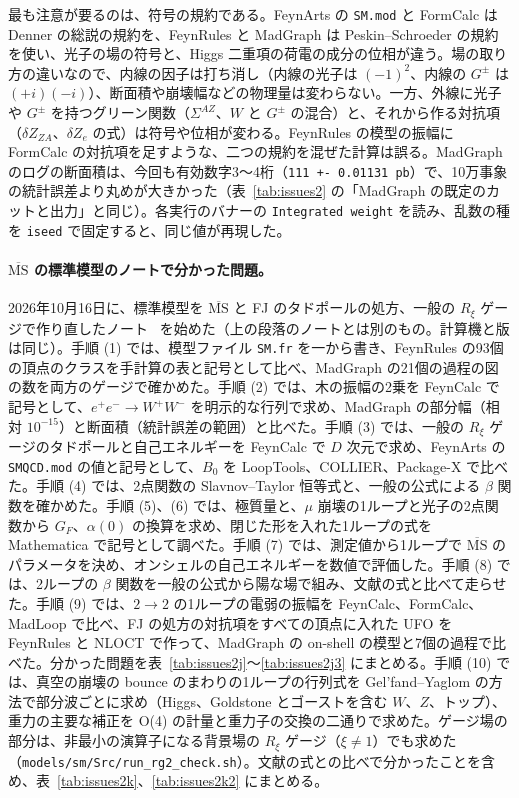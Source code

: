 \documentclass[a4paper,10pt]{ltjsarticle}
\begin{document}
最も注意が要るのは、符号の規約である。FeynArts の \texttt{SM.mod} と FormCalc は Denner の総説の規約を、FeynRules と MadGraph は Peskin--Schroeder の規約を使い、光子の場の符号と、Higgs 二重項の荷電の成分の位相が違う。場の取り方の違いなので、内線の因子は打ち消し（内線の光子は $(-1)^2$、内線の $G^\pm$ は $(+i)(-i)$）、断面積や崩壊幅などの物理量は変わらない。一方、外線に光子や $G^\pm$ を持つグリーン関数（$\Sigma^{AZ}$、$W$ と $G^\pm$ の混合）と、それから作る対抗項（$\delta Z_{ZA}$、$\delta Z_e$ の式）は符号や位相が変わる。FeynRules の模型の振幅に FormCalc の対抗項を足すような、二つの規約を混ぜた計算は誤る。MadGraph のログの断面積は、今回も有効数字3〜4桁（\texttt{111 +- 0.01131 pb}）で、10万事象の統計誤差より丸めが大きかった（表~\ref{tab:issues2} の「MadGraph の既定のカットと出力」と同じ）。各実行のバナーの \texttt{Integrated weight} を読み、乱数の種を \texttt{iseed} で固定すると、同じ値が再現した。

\paragraph{$\overline{\mathrm{MS}}$ の標準模型のノートで分かった問題。}2026年10月16日に、標準模型を $\overline{\mathrm{MS}}$ と FJ のタドポールの処方、一般の $R_\xi$ ゲージで作り直したノート~\cite{smmsbarnote} を始めた（上の段落のノートとは別のもの。計算機と版は同じ）。手順 (1) では、模型ファイル \texttt{SM.fr} を一から書き、FeynRules の93個の頂点のクラスを手計算の表と記号として比べ、MadGraph の21個の過程の図の数を両方のゲージで確かめた。手順 (2) では、木の振幅の2乗を FeynCalc で記号として、$e^+e^-\to W^+W^-$ を明示的な行列で求め、MadGraph の部分幅（相対 $10^{-15}$）と断面積（統計誤差の範囲）と比べた。手順 (3) では、一般の $R_\xi$ ゲージのタドポールと自己エネルギーを FeynCalc で $D$ 次元で求め、FeynArts の \texttt{SMQCD.mod} の値と記号として、$B_0$ を LoopTools、COLLIER、Package-X で比べた。手順 (4) では、2点関数の Slavnov--Taylor 恒等式と、一般の公式による $\beta$ 関数を確かめた。手順 (5)、(6) では、極質量と、$\mu$ 崩壊の1ループと光子の2点関数から $G_F$、$\alpha(0)$ の換算を求め、閉じた形を入れた1ループの式を Mathematica で記号として調べた。手順 (7) では、測定値から1ループで $\overline{\mathrm{MS}}$ のパラメータを決め、オンシェルの自己エネルギーを数値で評価した。手順 (8) では、2ループの $\beta$ 関数を一般の公式から陽な場で組み、文献の式と比べて走らせた。手順 (9) では、$2\to2$ の1ループの電弱の振幅を FeynCalc、FormCalc、MadLoop で比べ、FJ の処方の対抗項をすべての頂点に入れた UFO を FeynRules と NLOCT で作って、MadGraph の on-shell の模型と7個の過程で比べた。分かった問題を表~\ref{tab:issues2j}〜\ref{tab:issues2j3} にまとめる。手順 (10) では、真空の崩壊の bounce のまわりの1ループの行列式を Gel'fand--Yaglom の方法で部分波ごとに求め（Higgs、Goldstone とゴーストを含む $W$、$Z$、トップ）、重力の主要な補正を O(4) の計量と重力子の交換の二通りで求めた。ゲージ場の部分は、非最小の演算子になる背景場の $R_\xi$ ゲージ（$\xi\ne1$）でも求めた（\nolinkurl{models/sm/Src/run_rg2_check.sh}）。文献の式との比べで分かったことを含め、表~\ref{tab:issues2k}、\ref{tab:issues2k2} にまとめる。
\end{document}
